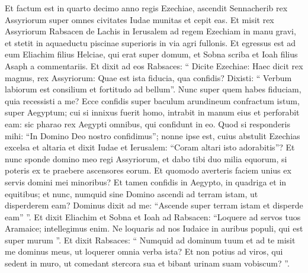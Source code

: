 \begin{biblechapter}
\begin{biblechapter}
\begin{biblechapter}
\begin{biblechapter}
\begin{biblechapter}
\begin{biblechapter}
\begin{biblechapter}
\begin{biblechapter}
\begin{biblechapter}
\begin{biblechapter}
\begin{biblechapter}
\begin{biblechapter}
\begin{biblechapter}
\begin{biblechapter}
\begin{biblechapter}
\begin{biblechapter}
\begin{biblechapter}
\begin{biblechapter}
\begin{biblechapter}
\begin{biblechapter}
\begin{biblechapter}
\begin{biblechapter}
\begin{biblechapter}
\begin{biblechapter}
\begin{biblechapter}
\begin{biblechapter}
\begin{biblechapter}
\begin{biblechapter}
\begin{biblechapter}
\begin{biblechapter}
\begin{biblechapter}
\begin{biblechapter}
\begin{biblechapter}
\begin{biblechapter}
\begin{biblechapter}
\begin{biblechapter}
\verse Et factum est in quarto decimo anno regis Ezechiae, ascendit Sennacherib rex Assyriorum super omnes civitates Iudae munitas et cepit eas. 
\verse Et misit rex Assyriorum Rabsacen de Lachis in Ierusalem ad regem Ezechiam in manu gravi, et stetit in aquaeductu piscinae superioris in via agri fullonis. 
\verse Et egressus est ad eum Eliachim filius Helciae, qui erat super domum, et Sobna scriba et Ioah filius Asaph a commentariis. 
\verse Et dixit ad eos Rabsaces: “ Dicite Ezechiae: Haec dicit rex magnus, rex Assyriorum: Quae est ista fiducia, qua confidis? 
\verse Dixisti: “ Verbum labiorum est consilium et fortitudo ad bellum”. Nunc super quem habes fiduciam, quia recessisti a me? 
\verse Ecce confidis super baculum arundineum confractum istum, super Aegyptum; cui si innixus fuerit homo, intrabit in manum eius et perforabit eam: sic pharao rex Aegypti omnibus, qui confidunt in eo. 
\verse Quod si responderis mihi: “In Domino Deo nostro confidimus”; nonne ipse est, cuius abstulit Ezechias excelsa et altaria et dixit Iudae et Ierusalem: “Coram altari isto adorabitis”? 
\verse Et nunc sponde domino meo regi Assyriorum, et dabo tibi duo milia equorum, si poteris ex te praebere ascensores eorum. 
\verse Et quomodo averteris faciem unius ex servis domini mei minoribus? Et tamen confidis in Aegypto, in quadriga et in equitibus; 
\verse et nunc, numquid sine Domino ascendi ad terram istam, ut disperderem eam? Dominus dixit ad me: “Ascende super terram istam et disperde eam” ”.
 \verse Et dixit Eliachim et Sobna et Ioah ad Rabsacen: “Loquere ad servos tuos Aramaice; intellegimus enim. Ne loquaris ad nos Iudaice in auribus populi, qui est super murum ”. 
\verse Et dixit Rabsaces: “ Numquid ad dominum tuum et ad te misit me dominus meus, ut loquerer omnia verba ista? Et non potius ad viros, qui sedent in muro, ut comedant stercora sua et bibant urinam suam vobiscum? ”.

\end{biblechapter}
\end{biblechapter}
\end{biblechapter}
\end{biblechapter}
\end{biblechapter}
\end{biblechapter}
\end{biblechapter}
\end{biblechapter}
\end{biblechapter}
\end{biblechapter}
\end{biblechapter}
\end{biblechapter}
\end{biblechapter}
\end{biblechapter}
\end{biblechapter}
\end{biblechapter}
\end{biblechapter}
\end{biblechapter}
\end{biblechapter}
\end{biblechapter}
\end{biblechapter}
\end{biblechapter}
\end{biblechapter}
\end{biblechapter}
\end{biblechapter}
\end{biblechapter}
\end{biblechapter}
\end{biblechapter}
\end{biblechapter}
\end{biblechapter}
\end{biblechapter}
\end{biblechapter}
\end{biblechapter}
\end{biblechapter}
\end{biblechapter}
\end{biblechapter}
